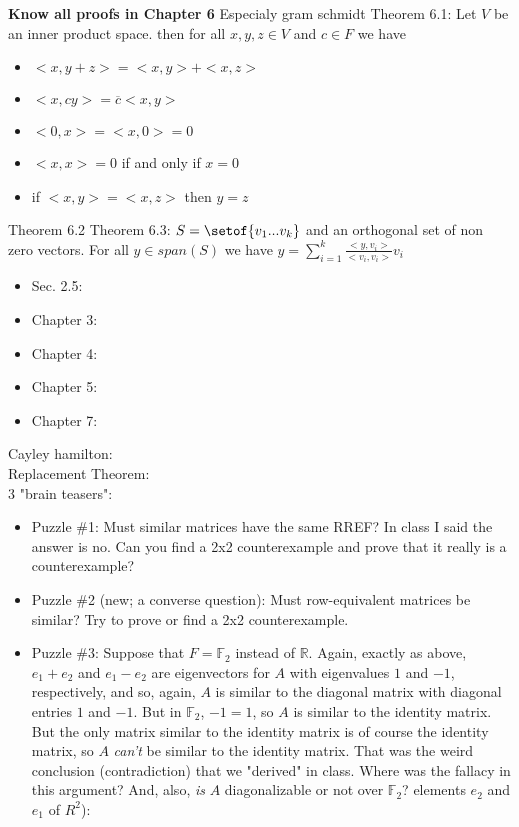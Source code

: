 \documentclass[answers,12pt,addpoints]{exam}
\begin{document}
\textbf{Know all proofs in Chapter 6}
Especialy gram schmidt
Theorem 6.1: Let $V$ be an inner product space. then for all $x,y,z \in V$ and $c\in F$ we have
\begin{itemize}
    \item $<x,y+z> = <x,y> + <x,z>$
    \item $< x,cy > = \overline{c}<x,y>$ 
    \item $<0,x> = <x,0> = 0$
    \item $<x,x> = 0$ if and only if $x = 0$
    \item if $<x,y> = <x,z>$ then $y = z$
\end{itemize}
Theorem 6.2
Theorem 6.3: $S = \setof{v_1 ... v_k}$ and an orthogonal set of non zero vectors. For all $y \in span(S)$ we have $y = \sum_{i=1}^{k} \frac{<y,v_i>}{<v_i,v_i>}v_i$\\



\begin{itemize}
    \item Sec. 2.5: 
    \item Chapter 3: 
    \item Chapter 4: 
    \item Chapter 5: 
    \item Chapter 7:
\end{itemize}
Cayley hamilton:\\
Replacement Theorem:\\
3 "brain teasers": \\
\begin{itemize}
    \item Puzzle \#1: Must similar matrices have the same RREF?  In class I said
the answer is no.  Can you find a 2x2 counterexample and prove that it
really is a counterexample?

\item Puzzle \#2 (new; a converse question): Must row-equivalent matrices be
similar?  Try to prove or find a 2x2 counterexample.

\item Puzzle \#3: Suppose that $F=\mathbb{F}_2$ instead of $\mathbb{R}$. Again, exactly
as above, $e_1+e_2$ and $e_1-e_2$ are eigenvectors for $A$ with eigenvalues
$1$ and $-1$, respectively, and so, again, $A$ is similar to the diagonal
matrix with diagonal entries $1$ and $-1$. But in $\mathbb{F}_2$, $-1=1$, so $A$ is
similar to the identity matrix. But the only matrix similar to the
identity matrix is of course the identity matrix, so $A$ \emph{can't} be
similar to the identity matrix. That was the weird conclusion
(contradiction) that we "derived" in class. Where was the fallacy in
this argument? And, also, \emph{is} $A$ diagonalizable or not over $\mathbb{F}_2$?
elements $e_2$ and $e_1$ of $R^2$):
\end{itemize}
\end{document}
